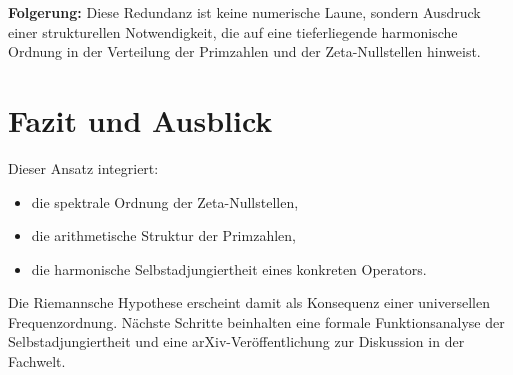 \documentclass[12pt]{article}
\begin{document}
\textbf{Folgerung:} Diese Redundanz ist keine numerische Laune, sondern Ausdruck einer strukturellen Notwendigkeit, die auf eine tieferliegende harmonische Ordnung in der Verteilung der Primzahlen und der Zeta-Nullstellen hinweist.

\section{Fazit und Ausblick}
Dieser Ansatz integriert:
\begin{itemize}
    \item die spektrale Ordnung der Zeta-Nullstellen,
    \item die arithmetische Struktur der Primzahlen,
    \item die harmonische Selbstadjungiertheit eines konkreten Operators.
\end{itemize}

Die Riemannsche Hypothese erscheint damit als Konsequenz einer universellen Frequenzordnung. Nächste Schritte beinhalten eine formale Funktionsanalyse der Selbstadjungiertheit und eine arXiv-Veröffentlichung zur Diskussion in der Fachwelt.
\end{document}
